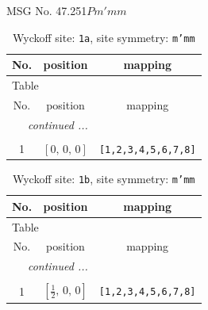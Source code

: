 \documentclass[fleqn,8pt]{jsarticle}
\begin{document}
\setcounter{MaxMatrixCols}{32}

\renewcommand{\tablename}{Table~}
\renewcommand{\figurename}{Figure~}
\begin{center}
\LARGE
MSG No. 47.251\quad$Pm'mm$
\end{center}
\renewcommand{\arraystretch}{1.2}
\begin{longtable}{ccc}
\caption{Wyckoff site: {\tt 1a}, site symmetry: {\tt m'mm}}
 \\
 \hline \hline
No. & position & mapping \\ \hline \endfirsthead

\multicolumn{2}{l}{\tablename\ \thetable{}} \\
 \hline \hline
No. & position & mapping \\ \hline \endhead

 \hline \hline
\multicolumn{2}{r}{\footnotesize\it continued ...} \\ \endfoot

 \hline \hline
\multicolumn{2}{r}{} \\ \endlastfoot

1 & $\left[ 0,\, 0,\, 0 \right]$ & {\tt [1,2,3,4,5,6,7,8]} \\
\end{longtable}
\renewcommand{\arraystretch}{1.2}
\begin{longtable}{ccc}
\caption{Wyckoff site: {\tt 1b}, site symmetry: {\tt m'mm}}
 \\
 \hline \hline
No. & position & mapping \\ \hline \endfirsthead

\multicolumn{2}{l}{\tablename\ \thetable{}} \\
 \hline \hline
No. & position & mapping \\ \hline \endhead

 \hline \hline
\multicolumn{2}{r}{\footnotesize\it continued ...} \\ \endfoot

 \hline \hline
\multicolumn{2}{r}{} \\ \endlastfoot

1 & $\left[ \frac{1}{2},\, 0,\, 0 \right]$ & {\tt [1,2,3,4,5,6,7,8]} \\
\end{longtable}
\renewcommand{\arraystretch}{1.2}
\end{document}
